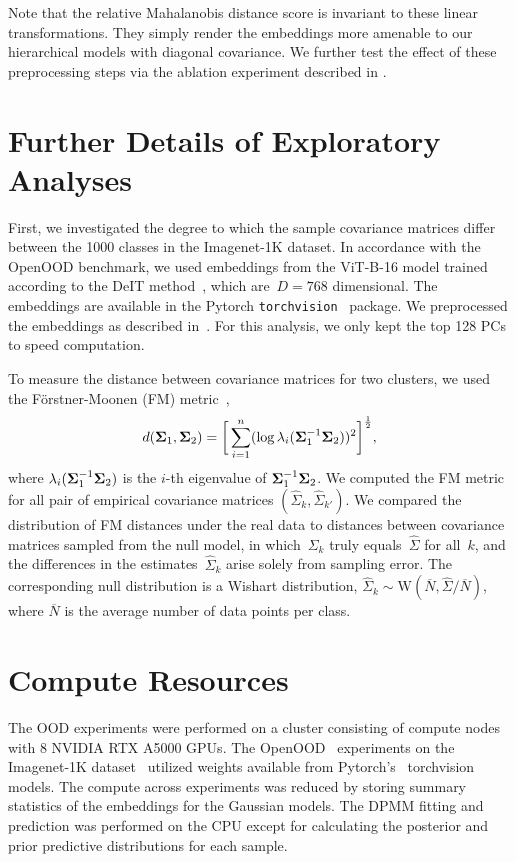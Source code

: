 Note that the relative Mahalanobis distance score is invariant to these linear
transformations. They simply render the embeddings more amenable to our
hierarchical models with diagonal covariance. We further test the effect of
these preprocessing steps via the ablation experiment described in
.

\section{Further Details of Exploratory Analyses}
\label{app:exploratory_details}

First, we investigated the degree to which the sample covariance matrices
differ between the 1000 classes in the Imagenet-1K dataset.
In accordance with the OpenOOD benchmark, we used embeddings from the ViT-B-16
model trained according to the DeIT method~\citep{touvron2021training}, which
are~$D=768$ dimensional.
The embeddings are available in the Pytorch
\texttt{torchvision}~\citep{torchvision2016} package.
We preprocessed the embeddings as described in~.
For this analysis, we only kept the top 128 PCs to speed computation.

To measure the distance between covariance matrices for two clusters, we used
the F\"orstner-Moonen (FM) metric~\citep{forstner_metric_2003},
\begin{align}
d(\boldsymbol{\Sigma}_1, \boldsymbol{\Sigma}_2) = \bigg[\sum_{i=1}^n (\log  \lambda_i (\boldsymbol{\Sigma}_1^{-1} \boldsymbol{\Sigma}_2))^{2}\bigg]^{\frac{1}{2}},
\end{align}
where $\lambda_i(\boldsymbol{\Sigma}_1^{-1} \boldsymbol{\Sigma}_2)$ is the $i$-th eigenvalue of $\boldsymbol{\Sigma}_1^{-1} \boldsymbol{\Sigma}_2$.
We computed the FM metric for all pair of empirical covariance matrices
$(\hat{\Sigma}_k, \hat{\Sigma}_{k'})$. We compared the distribution of FM
distances under the real data to distances between covariance matrices sampled
from the null model, in which~$\Sigma_k$ truly equals~$\hat{\Sigma}$ for
all~$k$, and the differences in the estimates~$\hat{\Sigma}_k$ arise solely
from sampling error. The corresponding null distribution is a Wishart
distribution, $\hat{\Sigma}_k \sim \mathrm{W}(\overline{N},
\hat{\Sigma}/\overline{N})$, where $\overline{N}$ is the average number of data
points per class.

\section{Compute Resources}
\label{app:compute}
The OOD experiments were performed on a cluster consisting of compute nodes
with 8 NVIDIA RTX A5000 GPUs. The
OpenOOD~\citep{yang2022openood,zhang23openood15} experiments on the Imagenet-1K
dataset~\citep{RussakovskyO15} utilized weights available from
Pytorch's~\citep{PYTORCH} torchvision~\citep{torchvision2016} models. The
compute across experiments was reduced by storing summary statistics of the
embeddings for the Gaussian models. The DPMM fitting and prediction was
performed on the CPU except for calculating the posterior and prior predictive
distributions for each sample.

